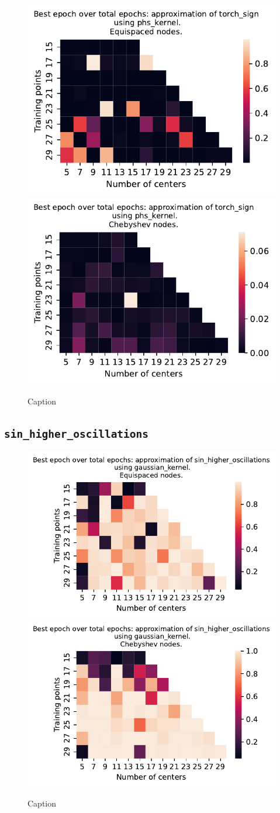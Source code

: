\documentclass[12pt]{report} %
\begin{document}
\begin{figure}[ht]
    \centering
    \includegraphics[width=.49\textwidth]{imagenes/experiments/1d/variational_epochs/torch_sign-Kphs_kernel-Equi-epochs.pdf}
    \includegraphics[width=.49\textwidth]{imagenes/experiments/1d/variational_epochs/torch_sign-Kphs_kernel-Cheb-epochs.pdf}
    \caption{Caption}
    \label{fig:epochs-torch-sign-phs}
\end{figure}

\clearpage 
\subsection*{\texttt{sin\_higher\_oscillations}}

\begin{figure}[ht]
    \centering
    
    \includegraphics[width=.49\textwidth]{imagenes/experiments/1d/variational_epochs/sin_higher_oscillations-Kgaussian_kernel-Equi-epochs.pdf}
    \includegraphics[width=.49\textwidth]{imagenes/experiments/1d/variational_epochs/sin_higher_oscillations-Kgaussian_kernel-Cheb-epochs.pdf}
    \caption{Caption}
    \label{fig:epochs-sin-higher-oscillations-gaussian}
\end{figure}
\end{document}
